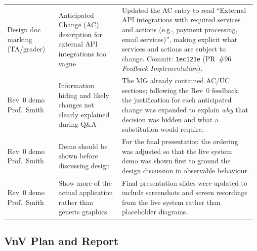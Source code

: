 \documentclass{article}
\begin{document}
\begin{longtable}{p{3.2cm} p{3.8cm} p{7.4cm}}
Design doc marking (TA/grader)
  & Anticipated Change (AC) description for external API integrations
    too vague
  & Updated the AC entry to read ``External API integrations with
    required services and actions (e.g., payment processing, email
    services)'', making explicit what services and actions are subject to
    change.
    Commit: \texttt{1ec121e} (PR~\#96 \textit{Feedback Implementation}).
\\[4pt]

Rev~0 demo Prof.\ Smith
  & Information hiding and likely changes not clearly explained during
    Q\&A
  & The MG already contained AC/UC sections; following the Rev~0
    feedback, the justification for each anticipated change was expanded
    to explain \textit{why} that decision was hidden and what a
    substitution would require.
\\[4pt]

Rev~0 demo Prof.\ Smith
  & Demo should be shown before discussing design
  & For the final presentation the ordering was adjusted so that the live
    system demo was shown first to ground the design discussion in
    observable behaviour.
\\[4pt]

Rev~0 demo Prof.\ Smith
  & Show more of the actual application rather than generic graphics
  & Final presentation slides were updated to include screenshots and
    screen recordings from the live system rather than placeholder
    diagrams.
\\

\bottomrule
\end{longtable}

\subsection{VnV Plan and Report}
\end{document}
